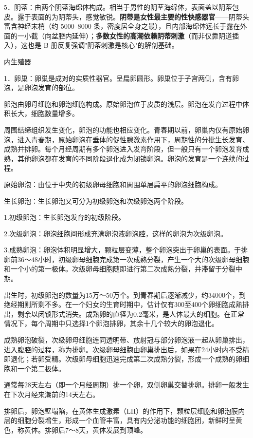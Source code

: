 \documentclass[12pt,UTF8,openany]{ctexbook}
\begin{document}
5．阴蒂：由两个阴蒂海绵体构成。相当于男性的阴茎海绵体，表面盖以阴蒂包皮。露于表面的为阴蒂头，感觉敏锐。\textbf{阴蒂是女性最主要的性快感器官}——阴蒂头富含神经末梢（约 5000--8000 条，密度居全身之最），且内部海绵体远长于露在外面的一小截（向盆腔内延伸）；\textbf{多数女性的高潮依赖阴蒂刺激}（而非仅靠阴道插入），这也是 B 册反复强调"阴蒂刺激是核心"的解剖基础。

内生殖器

1．卵巢：卵巢是成对的实质性器官。呈扁卵圆形。卵巢位于子宫两侧，含有卵泡，是卵泡发育的部位。

卵泡由卵母细胞和卵泡细胞构成。原始卵泡位于皮质的浅层。卵泡在发育过程中体积长大，细胞数量增多。

周围结缔组织发生变化，卵泡的功能也相应变化。青春期以前，卵巢内仅有原始卵泡，进入青春期，原始卵泡在垂体的促性腺激素作用下，周期性的分批生长发育、成熟并排卵。每个月经周期有多个卵泡进入发育阶段，但一般只有一个卵泡发育成熟，其他卵泡都在发育的不同阶段退化成为闭锁卵泡。卵泡的发育是一个连续的过程。

原始卵泡：由位于中央的初级卵母细胞和周围单层扁平的卵泡细胞构成。

生长卵泡：生长卵泡又可分为初级卵泡和次级卵泡两个阶段。

1.初级卵泡：生长卵泡发育的初级阶段。

2.次级卵泡：卵泡细胞间形成充满卵泡液卵泡腔，这样的卵泡为次级卵泡。

3.成熟卵泡：卵泡体积明显增大，颗粒层变薄，整个卵泡突出于卵巢的表面。于排卵前36～48小时，初级卵母细胞完成第一次成熟分裂，产生一个大的次级卵母细胞和一个小的第一极体。次级卵母细胞随即进行第二次成熟分裂，并滞留于分裂中期。

出生时，初级卵泡的数量为15万～50万个。到青春期后逐渐减少，约34000个，到绝经期则所剩不多。在一个妇女的生育时期中，估计仅有300至400个卵细胞成熟排出，剩余以闭锁形式消失。成熟卵的直径为0.2毫米，是人体最大的细胞。在正常情况下，每个周期中只选择1个卵泡排卵，其余十几个较大的卵泡退化。

成熟卵泡破裂，次级卵母细胞连同透明带、放射冠与部分卵泡液一起从卵巢排出，进入腹腔的过程，称为排卵。次级卵母细胞由卵巢排出后，如果在24小时内不受精即退化；若卵受精。次级卵母细胞迅速完成第二次成熟分裂，形成一个成熟的卵细胞和一个第二极体。

通常每28天左右（即一个月经周期）排一个卵，双侧卵巢交替排卵。排卵一般发生在下次月经来潮前的14天左右。

排卵后，卵泡壁塌陷，在黄体生成激素（LH）的作用下，颗粒层细胞和卵泡膜内层的细胞分裂增生，形成一个血管丰富，具有内分泌功能的细胞团，新鲜时呈黄色，称黄体。排卵后7～8天，黄体发展到顶峰。
\end{document}
